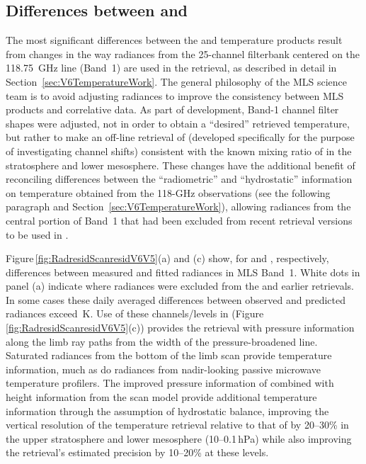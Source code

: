 \subsection{Differences between \thisv and \prevv}
\label{subsec:v6v5T}
The most significant differences between the \thisv and \prevv temperature products result from changes in the way radiances from the 25-channel filterbank centered on the 118.75~GHz  line (Band~1) are used in the retrieval, as described in detail in Section~\ref{sec:V6TemperatureWork}.  The general philosophy of the MLS science team is to avoid adjusting radiances to improve the consistency between MLS products and correlative data. As part of \thisv development, Band-1 channel filter shapes were adjusted, not in order to obtain a ``desired'' retrieved temperature, but rather to make an off-line retrieval of  (developed specifically for the purpose of investigating channel shifts) consistent with the known mixing ratio of  in the stratosphere and lower mesosphere. These changes have the additional benefit of reconciling differences between the ``radiometric'' and ``hydrostatic'' information on temperature obtained from the \mbox{118-GHz} observations (see the following paragraph and Section~\ref{sec:V6TemperatureWork}), allowing radiances from the central portion of Band~1 that had been excluded from recent retrieval versions to be used in \thisv.

Figure\,\ref{fig:RadresidScanresidV6V5}(a) and (c) show, for \prevv and \thisv, respectively, differences between measured and fitted radiances in MLS Band~1.  White dots in panel (a) indicate where radiances were excluded from the \prevv and earlier retrievals. In some cases these daily averaged differences between observed and predicted radiances exceed \,K. Use of these channels/levels in \thisv (Figure\,\ref{fig:RadresidScanresidV6V5}(c)) provides the retrieval with pressure information along the limb ray paths from the width of the pressure-broadened  line. Saturated radiances from the bottom of the limb scan provide temperature information, much as do radiances from nadir-looking passive microwave temperature profilers. The improved pressure information of \thisv combined with height information from the scan model provide additional temperature information through the assumption of hydrostatic balance, improving the vertical resolution of the \thisv temperature retrieval relative to that of \prevv by 20--30\% in the upper stratosphere and lower mesosphere (10--0.1\,hPa) while also improving the retrieval's estimated precision by 10--20\% at these levels.  

